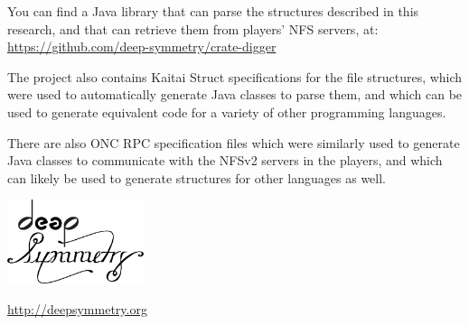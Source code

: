 \documentclass[11pt]{article}
\begin{document}
You can find a Java library that can parse the structures described in
this research, and that can retrieve them from players' NFS servers,
at: \url{https://github.com/deep-symmetry/crate-digger}

The project also contains Kaitai Struct specifications for the file
structures, which were used to automatically generate Java classes to
parse them, and which can be used to generate equivalent code for a
variety of other programming languages.

There are also ONC RPC specification files which were similarly used
to generate Java classes to communicate with the NFSv2 servers in the
players, and which can likely be used to generate structures for other
languages as well.

\begin{appendix}

  \listoffigures

  \listoftables

  \begin{center}
    \begin{samepage}
      \includegraphics[width=4cm]{assets/DS-Logo-bw-4k}

      \vspace{0.25cm}
      \url{http://deepsymmetry.org}
    \end{samepage}
  \end{center}

\end{appendix}
\end{document}
